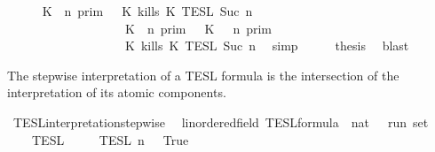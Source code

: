 \begin{isabellebody}
\ \isamarkupfalse%
\ {\isacartoucheopen}{\isachardot}{\isachardot}{\isachardot}\ {\isacharequal}\ {\isasymlbrakk}\ K\ {\isasymnot}{\isasymUp}\ n\ {\isasymrbrakk}\isactrlsub p\isactrlsub r\isactrlsub i\isactrlsub m\ {\isasyminter}\ {\isasymlbrakk}\ K\ kills\ K\ {\isasymrbrakk}\isactrlsub T\isactrlsub E\isactrlsub S\isactrlsub L\isactrlbsup {\isasymge}\ Suc\ n\isactrlesup \isanewline
\ \ \ \ \ \ \ \ \ \ \ \ \ \ \ \ \ {\isasymunion}\ {\isasymlbrakk}\ K\ {\isasymUp}\ n\ {\isasymrbrakk}\isactrlsub p\isactrlsub r\isactrlsub i\isactrlsub m\ {\isasyminter}\ {\isasymlbrakk}\ K\ {\isasymnot}{\isasymUp}\ {\isasymge}\ n\ {\isasymrbrakk}\isactrlsub p\isactrlsub r\isactrlsub i\isactrlsub m\isanewline
\ \ \ \ \ \ \ \ \ \ \ \ \ \ \ \ \ {\isasyminter}\ {\isasymlbrakk}\ K\ kills\ K\ {\isasymrbrakk}\isactrlsub T\isactrlsub E\isactrlsub S\isactrlsub L\isactrlbsup {\isasymge}\ Suc\ n\isactrlesup {\isacartoucheclose}\ \isamarkupfalse%
\ simp\isanewline
\ \ \isamarkupfalse%
\ \isamarkupfalse%
\ {\isacharquery}thesis\ \isamarkupfalse%
\ blast\isanewline
{}\isamarkupfalse%
%
\endisatagproof
{\isafoldproof}%
%
\isadelimproof
%
\endisadelimproof
%
\begin{isamarkuptext}%
The stepwise interpretation of a TESL formula is the intersection of the
  interpretation of its atomic components.%
\end{isamarkuptext}\isamarkuptrue%
\isamarkupfalse%
\ TESL{\isacharunderscore}interpretation{\isacharunderscore}stepwise\isanewline
\ \ {\isacharcolon}{\isacharcolon}{\isacartoucheopen}{\isacharprime}{\isasymtau}{\isacharcolon}{\isacharcolon}linordered{\isacharunderscore}field\ TESL{\isacharunderscore}formula\ {\isasymRightarrow}\ nat\ {\isasymRightarrow}\ {\isacharprime}{\isasymtau}\ run\ set{\isacartoucheclose}\isanewline
\ \ {\isacharparenleft}{\isacartoucheopen}{\isasymlbrakk}{\isasymlbrakk}\ {\isacharunderscore}\ {\isasymrbrakk}{\isasymrbrakk}\isactrlsub T\isactrlsub E\isactrlsub S\isactrlsub L\isactrlbsup {\isasymge}\ {\isacharunderscore}\isactrlesup {\isacartoucheclose}{\isacharparenright}\isanewline
{}\isanewline
\ \ {\isacartoucheopen}{\isasymlbrakk}{\isasymlbrakk}\ {\isacharbrackleft}{\isacharbrackright}\ {\isasymrbrakk}{\isasymrbrakk}\isactrlsub T\isactrlsub E\isactrlsub S\isactrlsub L\isactrlbsup {\isasymge}\ n\isactrlesup \ {\isacharequal}\ {\isacharbraceleft}{\isasymrho}{\isachardot}\ True{\isacharbraceright}{\isacartoucheclose}\isanewline

\end{isabellebody}
